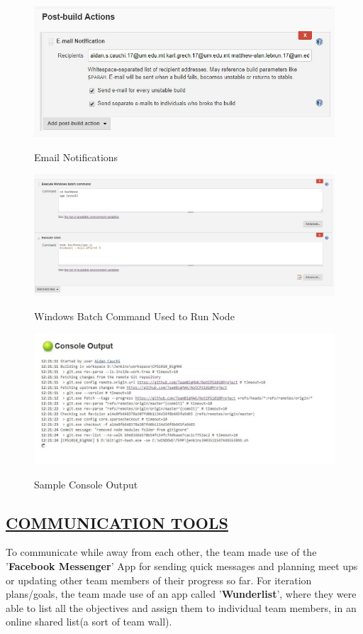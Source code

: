 \documentclass[paper=a4,fontsize=11pt]{article}
\newcommand{\sepspace}{\vspace*{1em}}		%
\newcommand{\SectionPart}[1]{\subsection*{\uppercase{#1}}}
\begin{document}
\begin{figure}[H]
  \caption{Email Notifications}
  \includegraphics[width=15cm]{Jenkins/pic4.JPG}\\
  \sepspace
\end{figure}
\begin{figure}[H]
  \caption{Windows Batch Command Used to Run Node}
  \includegraphics[width=15cm]{Jenkins/pic6.JPG}\\
  \sepspace
\end{figure}
\begin{figure}[H]
  \caption{Sample Console Output}
  \includegraphics[width=15cm]{Jenkins/pic7.JPG}\\
  \sepspace
\end{figure}

\SectionPart{\ul{Communication Tools}}
To communicate while away from each other, the team made use of the '\textbf{Facebook
Messenger}' App for sending quick messages and planning meet ups or updating other
team members of their progress so far. For iteration plans/goals, the team made
use of an app called '\textbf{Wunderlist}', where they were able to list all the objectives
and assign them to individual team members, in an online shared list(a sort of team wall).
\end{document}
